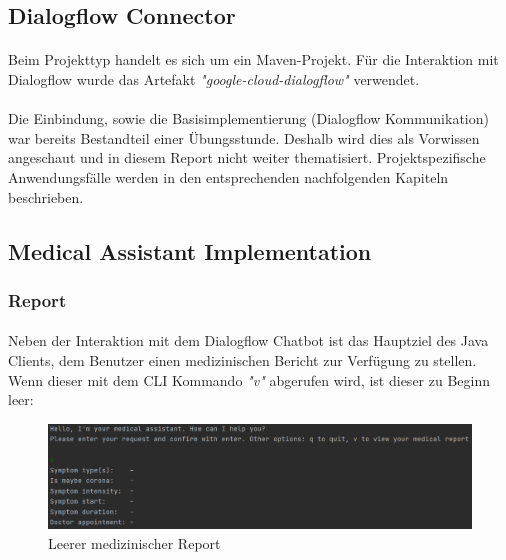 \documentclass[11pt,a4paper]{article}
\begin{document}
	\subsection{Dialogflow Connector}
		\paragraph{}
			Beim Projekttyp handelt es sich um ein Maven-Projekt. Für die Interaktion mit Dialogflow wurde das Artefakt 
			\emph{"google-cloud-dialogflow"} verwendet.
		
		\paragraph{}
			Die Einbindung, sowie die Basisimplementierung (Dialogflow Kommunikation) war bereits Bestandteil einer Übungsstunde.
			Deshalb wird dies als Vorwissen angeschaut und in diesem Report nicht weiter thematisiert. Projektspezifische Anwendungsfälle
			werden in den entsprechenden nachfolgenden Kapiteln beschrieben.
	
	\subsection{Medical Assistant Implementation}
		\subsubsection{Report}
			\paragraph{}
				Neben der Interaktion mit dem Dialogflow Chatbot ist das Hauptziel des Java Clients, dem Benutzer einen medizinischen 
				Bericht zur Verfügung zu stellen. Wenn dieser mit dem CLI Kommando \emph{"v"} abgerufen wird, ist dieser zu Beginn leer:
				\begin{figure}[h!]
					\begin{center}
        	    		\includegraphics[width=1.0\linewidth]{JavaClient-EmptyReport.png}
		    	        \caption{Leerer medizinischer Report}
		        	    \label{fig:javaClient_emptyReport}
					\end{center}
		        \end{figure}
		        
\end{document}

